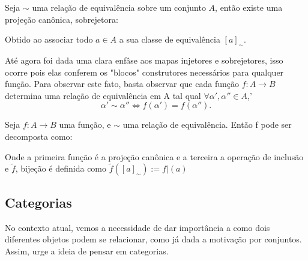 \documentclass[../main]{subfiles}
\begin{document}
\begin{example}
    Seja \(\sim \) uma relação de equivalência sobre um conjunto \(A\), então
    existe uma projeção canônica, sobrejetora:
    \begin{center}
    \end{center}

    Obtido ao associar todo \(a \in A\) a sua classe de equivalência
    \([a]_\sim\).
\end{example}

Até agora foi dada uma clara enfâse aos mapas injetores e sobrejetores, isso
ocorre pois elas conferem os "blocos" construtores necessários para qualquer
função. Para observar este fato, basta observar que cada função \(f: A \to B\)
determina uma relação de equivalência em A tal qual \(\forall \alpha', \alpha''
\in A\),' 
\[\alpha' \sim \alpha'' \iff f(\alpha') = f(\alpha'').\]
\begin{prop}
    Seja \(f: A \to B\) uma função, e \(\sim\) uma relação de equivalência.
    Então f pode ser decomposta como:

Onde a primeira função é a projeção canônica e a terceira a operação de inclusão
e \(\tilde f\), bijeção é definida como \(\tilde f([a]_\sim) := f|(a)\)
\end{prop}

\subsection{Categorias}

No contexto atual, vemos a necessidade de dar importância a como dois diferentes
objetos podem se relacionar, como já dada a motivação por conjuntos. Assim, urge
a ideia de pensar em categorias.
\end{document}
